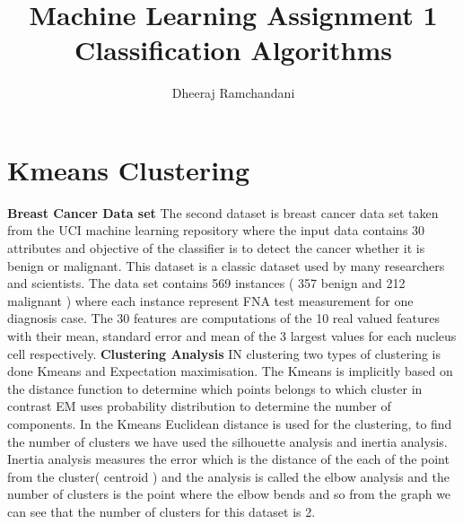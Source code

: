 \documentclass[a4paper,12pt]{article}
\title{\Large{\textbf{Machine Learning Assignment 1 Classification Algorithms }}}
\author{Dheeraj Ramchandani}
\begin{document}
\maketitle
\tableofcontents
\newpage


\section{ Kmeans Clustering   } 
\textbf{ Breast Cancer Data set} 
The second dataset is breast cancer data set taken from the UCI machine learning repository where the input data contains 30 attributes and objective of the classifier is to detect the cancer whether it is benign or malignant. This dataset is a classic dataset used by many researchers and scientists. The data set contains 569 instances ( 357 benign and 212 malignant ) where each instance represent FNA test measurement for one diagnosis case. The 30 features are computations of the 10 real valued features with their mean, standard error and mean of the 3 largest values for each nucleus cell respectively.\newline
\textbf{ Clustering Analysis } IN clustering two types of clustering is done Kmeans and Expectation maximisation.  The Kmeans  is implicitly based on the distance function to determine which points belongs to which cluster in contrast  EM uses probability distribution to determine the number of components. In the Kmeans Euclidean distance is used for the clustering, to find the number of clusters we have used the silhouette analysis and inertia analysis. Inertia analysis measures the error which is the distance of the each of the point from the cluster( centroid ) and the analysis is called the elbow analysis and the number of clusters is the point where the elbow bends and so from the graph we can see that the number of clusters for this dataset is 2. \newline
\end{document}
